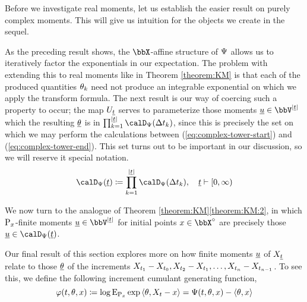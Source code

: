 

Before we investigate real moments, let us establish the easier result on purely complex moments.
This will give us intuition for the objects we create in the sequel.




As the preceding result shows, the $\stateSpace$-affine structure of $\Psi$ allows us to iteratively factor the exponentials in our expectation.
The problem with extending this to real moments like in Theorem \ref{theorem:KM} is that each of the produced quantities $\theta_k$ need not produce an integrable exponential on which we apply the transform formula.
The next result is our way of coercing such a property to occur; the map $U_{\underline t}$ serves to parameterize those moments $\underline\momentVar \in \vecSpace^{|\underline t|}$ which the resulting $\underline{\theta}$ is in $\prod_{k=1}^{|\underline t|} \momentSpace(\Delta t_k)$, since this is precisely the set on which we may perform the calculations between (\ref{eq:complex-tower-start}) and (\ref{eq:complex-tower-end}).
This set turns out to be important in our discussion, so we will reserve it special notation.
\begin{equation*}
  \momentSpace(\underline t) \defeq \prod_{k=1}^{|\underline t|} \momentSpace(\Delta t_k), \quad \underline t \vdash [0,\infty)
\end{equation*}



We now turn to the analogue of Theorem \ref{theorem:KM}\ref{theorem:KM:2}, in which ${\operatorname{P}}_x$-finite moments $\underline\momentVar \in \vecSpace^{|\underline t|}$ for initial points $\stateVar \in \stateSpace^\circ$ are precisely those $\underline\momentVar \in \momentSpace(\underline t)$.



Our final result of this section explores more on how finite moments $\underline{u}$ of $X_{\underline t}$ relate to those $\underline{\theta}$ of the increments $X_{t_1}-X_{t_0}, X_{t_2} - X_{t_1}, \ldots, X_{t_n} - X_{t_{n-1}}$.
To see this, we define the following increment cumulant generating function,
\begin{equation*}
  \varphi(t, \theta, x) \coloneqq \log{\operatorname{E}}_{{\operatorname{P}}_x}\exp{\langle \theta, X_t-x\rangle} = \Psi(t, \theta, x) - {\langle \theta , x \rangle}
\end{equation*}



